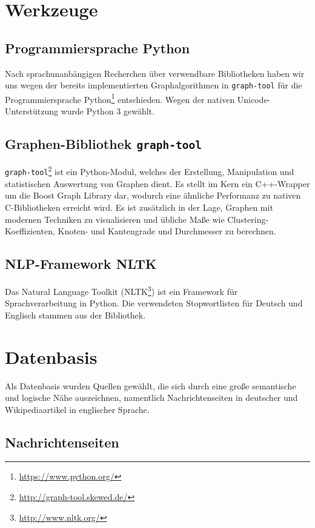 \documentclass[11pt, a4paper]{article}
\begin{document}
\section{Werkzeuge}

\subsection{Programmiersprache Python}
Nach sprachunanbängigen Recherchen über verwendbare Bibliotheken haben wir uns wegen der bereits implementierten Graphalgorithmen in \texttt{graph-tool} für die Programmiersprache Python\footnote{\url{https://www.python.org/}} entschieden. Wegen der nativen Unicode-Unterstützung wurde Python 3 gewählt.

\subsection{Graphen-Bibliothek \texttt{graph-tool}}
\texttt{graph-tool}\footnote{\url{http://graph-tool.skewed.de/}} ist ein Python-Modul,
welches der Erstellung, Manipulation und statistischen
Auswertung von Graphen dient. Es stellt im Kern ein C++-Wrapper um die Boost
Graph Library dar, wodurch eine \"ahnliche Performanz zu nativen C-Bibliotheken
erreicht wird. Es ist zus\"atzlich in der Lage, Graphen mit modernen Techniken
zu visualisieren und \"ubliche Ma\ss{}e wie Clustering-Koeffizienten, Knoten-
und Kantengrade und Durchmesser zu berechnen.

\subsection{NLP-Framework NLTK}
Das Natural Language Toolkit (NLTK\footnote{\url{http://www.nltk.org/}}) ist ein Framework f\"ur Sprachverarbeitung in Python.
Die verwendeten Stopwortlisten für Deutsch und Englisch stammen aus der Bibliothek.


\section{Datenbasis}

Als Datenbasis wurden Quellen gew\"ahlt, die sich durch eine gro\ss{}e
semantische und logische N\"ahe auszeichnen, namentlich Nachrichtenseiten in
deutscher und Wikipediaartikel in englischer Sprache.

\subsection{Nachrichtenseiten}
\label{nrseiten}
\end{document}
